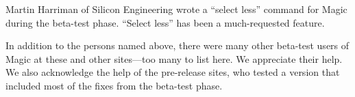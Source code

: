 \documentclass[letterpaper,twoside,12pt]{article}
\begin{document}
Martin Harriman of Silicon Engineering wrote a ``select less'' command for 
Magic during the beta-test phase.  ``Select less'' has been a 
much-requested feature.

In addition to the persons named above, there were many other beta-test
users of Magic at these and other sites---too many to list here.  We 
appreciate their help.  We also acknowledge the help of the pre-release
sites, who tested a version that included most of the fixes from the beta-test
phase.
\end{document}
